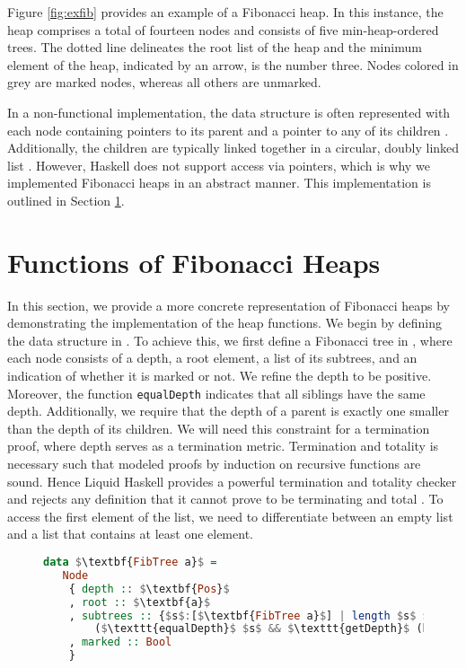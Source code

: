 \documentclass{clmthesis}
\begin{document}
Figure \ref{fig:exfib} provides an example of a Fibonacci heap. In this instance, the heap comprises a total of fourteen nodes and consists of five min-heap-ordered trees. The dotted line delineates the root list of the heap and the minimum element of the heap, indicated by an arrow, is the number three. Nodes colored in grey are marked nodes, whereas all others are unmarked.

In a non-functional implementation, the data structure is often represented with each node containing pointers to its parent and a pointer to any of its children \cite{brodal2012strict, kaplan2014fibonacci, fredman1987fibonacci}. Additionally, the children are typically linked together in a circular, doubly linked list \cite{thomas2022, fredman1987fibonacci}. However, Haskell does not support access via pointers, which is why we implemented Fibonacci heaps in an abstract manner. This implementation is outlined in Section \ref{fib_fun}.

\section{Functions of Fibonacci Heaps}\label{fib_fun}
In this section, we provide a more concrete representation of Fibonacci heaps by demonstrating the implementation of the heap functions. We begin by defining the data structure in . To achieve this, we first define a Fibonacci tree in , where each node consists of a depth, a root element, a list of its subtrees, and an indication of whether it is marked or not. We refine the depth to be positive. Moreover, the function \texttt{equalDepth} indicates that all siblings have the same depth. Additionally, we require that the depth of a parent is exactly one smaller than the depth of its children. We will need this constraint for a termination proof, where depth serves as a termination metric. Termination and totality is necessary such that modeled proofs by induction on recursive functions are sound. Hence Liquid Haskell provides a powerful termination and totality checker and rejects any definition that it cannot prove to be terminating and total \cite{vazou2018theorem}. To access the first element of the list, we need to differentiate between an empty list and a list that contains at least one element.

\begin{figure}[h]
\begin{lstlisting}[mathescape=true, language=haskell, caption={Refinement of the data structure \textbf{FibTree a}.},captionpos=b, label=fig:fibtree]
data $\textbf{FibTree a}$ = 
   Node 
	{ depth :: $\textbf{Pos}$
	, root :: $\textbf{a}$
	, subtrees :: {$s$:[$\textbf{FibTree a}$] | length $s$ $==$ 0 || 
		($\texttt{equalDepth}$ $s$ && $\texttt{getDepth}$ (head $s$) $==$ depth + 1)}
	, marked :: Bool
	}
\end{lstlisting}
\end{figure}
\end{document}
